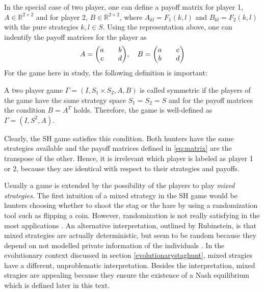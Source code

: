 \documentclass[11pt]{article}
\newcommand{\realnumb}{\mathbb{R}}
\begin{document}
In the special case of two player, one 
can define a payoff matrix for player 1, $A \in \realnumb^{2 \times2}$ and for 
player 2,  $B \in \realnumb^{2 \times2}$, where $A_{kl} = F_1(k,l)$ and $
B_{kl} = F_2(k,l)$ with the pure strategies $k,l \in S$. Using the 
representation above, one can indentify the payoff matrices for the player as
\begin{align}
     A = \mqty(a && b \\ c && d), \quad B = \mqty(a && c \\ b && d)
        \label{eq:matrix}
\end{align}
For the game here in study, the following definition is important: 
\begin{mydef}
        A two player game $\Gamma=(I,S_1 \times S_2, A,B)$ is called symmetric
        if the players of the game have the same strategy space $S_1=S_2=S$ and
        for the payoff matrices the condition $B=A^T$ holds. Therefore, the
        game is well-defined as $\Gamma=(I,S^2,A)$.
        \label{symmetry}
\end{mydef}
Clearly, the SH game satisfies this condition. Both hunters have the same 
strategies available and the payoff matrices defined in 
\eqref{eq:matrix}  are the transpose of the other.
Hence, it is irrelevant which player is labeled as player 1 or 2, because 
they are identical with respect to their strategies and payoffs.

Usually a game is extended by the possibility of the players to play
\textit{mixed strategies}. 
The first intuition of a mixed strategy in the SH game would be hunters
choosing whether to shoot the stag or the hare by using a randomization
tool such as flipping a coin. However, randomization is not really
satisfying in the most applications \parencite{radner_private_1982}. An
alternative interpretation, outlined by Rubinstein, is that mixed 
strategies are actually deterministic, but seem to be random because they 
depend on not modelled private information of the individuals 
\parencite[914]{rubinstein_comments_1991}. In the evolutionary context
discussed in section \ref{evolutionarystaghunt}, mixed stragies have
a different, unproblematic interpretation. Besides the interpretation,
mixed stragies are appealing because they ensure the existence
of a Nash equilibrium which is defined later in this text.
\end{document}
